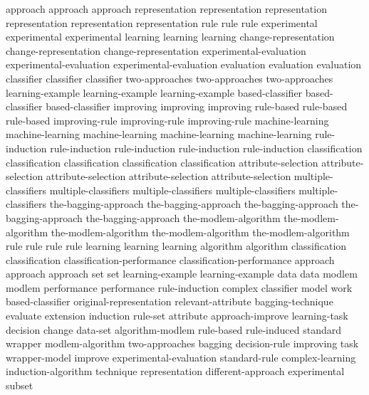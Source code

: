 approach	approach	approach	
representation	representation	representation	representation	representation	representation	
rule	rule	rule	
experimental	experimental	experimental	
learning	learning	learning	
change-representation	change-representation	change-representation	
experimental-evaluation	experimental-evaluation	experimental-evaluation	
evaluation	evaluation	evaluation	
classifier	classifier	classifier	
two-approaches	two-approaches	two-approaches	
learning-example	learning-example	learning-example	
based-classifier	based-classifier	based-classifier	
improving	improving	improving	
rule-based	rule-based	rule-based	
improving-rule	improving-rule	improving-rule	
machine-learning	machine-learning	machine-learning	machine-learning	machine-learning	
rule-induction	rule-induction	rule-induction	rule-induction	rule-induction	
classification	classification	classification	classification	classification	
attribute-selection	attribute-selection	attribute-selection	attribute-selection	attribute-selection	
multiple-classifiers	multiple-classifiers	multiple-classifiers	multiple-classifiers	multiple-classifiers	
the-bagging-approach	the-bagging-approach	the-bagging-approach	the-bagging-approach	the-bagging-approach	
the-modlem-algorithm	the-modlem-algorithm	the-modlem-algorithm	the-modlem-algorithm	the-modlem-algorithm	
rule	rule	rule	rule	
learning	learning	learning	
algorithm	algorithm	
classification	classification	
classification-performance	classification-performance	
approach	approach	approach	
set	set	
learning-example	learning-example	
data	data	
modlem	modlem	
performance	performance	
rule-induction	
complex	
classifier	
model	
work	
based-classifier	
original-representation	
relevant-attribute	
bagging-technique	
evaluate	
extension	
induction	
rule-set	
attribute	
approach-improve	
learning-task	
decision	
change	
data-set	
algorithm-modlem	
rule-based	
rule-induced	
standard	
wrapper	
modlem-algorithm	
two-approaches	
bagging	
decision-rule	
improving	
task	
wrapper-model	
improve	
experimental-evaluation	
standard-rule	
complex-learning	
induction-algorithm	
technique	
representation	
different-approach	
experimental	
subset	
